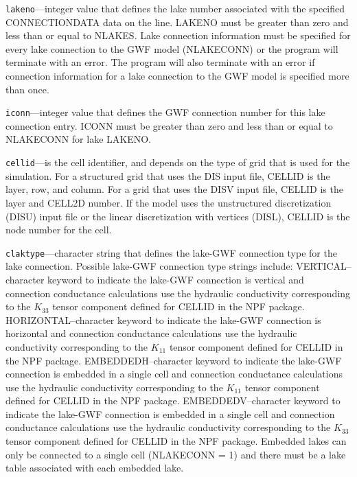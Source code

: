 \begin{description}
\item \texttt{lakeno}---integer value that defines the lake number associated with the specified CONNECTIONDATA data on the line. LAKENO must be greater than zero and less than or equal to NLAKES. Lake connection information must be specified for every lake connection to the GWF model (NLAKECONN) or the program will terminate with an error.  The program will also terminate with an error if connection information for a lake connection to the GWF model is specified more than once.

\item \texttt{iconn}---integer value that defines the GWF connection number for this lake connection entry. ICONN must be greater than zero and less than or equal to NLAKECONN for lake LAKENO.

\item \texttt{cellid}---is the cell identifier, and depends on the type of grid that is used for the simulation.  For a structured grid that uses the DIS input file, CELLID is the layer, row, and column.   For a grid that uses the DISV input file, CELLID is the layer and CELL2D number.  If the model uses the unstructured discretization (DISU) input file or the linear discretization with vertices (DISL), CELLID is the node number for the cell.

\item \texttt{claktype}---character string that defines the lake-GWF connection type for the lake connection. Possible lake-GWF connection type strings include:  VERTICAL--character keyword to indicate the lake-GWF connection is vertical  and connection conductance calculations use the hydraulic conductivity corresponding to the $K_{33}$ tensor component defined for CELLID in the NPF package. HORIZONTAL--character keyword to indicate the lake-GWF connection is horizontal and connection conductance calculations use the hydraulic conductivity corresponding to the $K_{11}$ tensor component defined for CELLID in the NPF package. EMBEDDEDH--character keyword to indicate the lake-GWF connection is embedded in a single cell and connection conductance calculations use the hydraulic conductivity corresponding to the $K_{11}$ tensor component defined for CELLID in the NPF package. EMBEDDEDV--character keyword to indicate the lake-GWF connection is embedded in a single cell and connection conductance calculations use the hydraulic conductivity corresponding to the $K_{33}$ tensor component defined for CELLID in the NPF package. Embedded lakes can only be connected to a single cell (NLAKECONN = 1) and there must be a lake table associated with each embedded lake.


\end{description}
